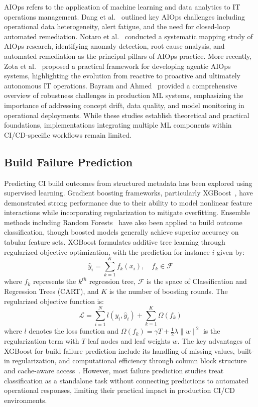 \documentclass[sn-nature]{sn-jnl}
\theoremstyle{thmstyleone}
\theoremstyle{thmstyletwo}
\theoremstyle{thmstylethree}
\begin{document}
AIOps refers to the application of machine learning and data analytics to IT operations management.
Dang et al.~\cite{dang2019aiops} outlined key AIOps challenges including operational data heterogeneity, alert fatigue, and the need for closed-loop automated remediation.
Notaro et al.~\cite{notaro2021aiops} conducted a systematic mapping study of AIOps research, identifying anomaly detection, root cause analysis, and automated remediation as the principal pillars of AIOps practice.
More recently, Zota et al.~\cite{zota2025agentic} proposed a practical framework for developing agentic AIOps systems, highlighting the evolution from reactive to proactive and ultimately autonomous IT operations.
Bayram and Ahmed~\cite{bayram2025trustworthy} provided a comprehensive overview of robustness challenges in production ML systems, emphasizing the importance of addressing concept drift, data quality, and model monitoring in operational deployments.
While these studies establish theoretical and practical foundations, implementations integrating multiple ML components within CI/CD-specific workflows remain limited.

\subsection{Build Failure Prediction}\label{subsec:failure}

Predicting CI build outcomes from structured metadata has been explored using supervised learning.
Gradient boosting frameworks, particularly XGBoost~\cite{chen2016xgboost}, have demonstrated strong performance due to their ability to model nonlinear feature interactions while incorporating regularization to mitigate overfitting.
Ensemble methods including Random Forests~\cite{breiman2001random} have also been applied to build outcome classification, though boosted models generally achieve superior accuracy on tabular feature sets.
XGBoost formulates additive tree learning through regularized objective optimization, with the prediction for instance $i$ given by:
\begin{equation}
\hat{y}_i = \sum_{k=1}^{K} f_k(x_i), \quad f_k \in \mathcal{F}
\end{equation}
where $f_k$ represents the $k^{th}$ regression tree, $\mathcal{F}$ is the space of Classification and Regression Trees (CART), and $K$ is the number of boosting rounds.
The regularized objective function is:
\begin{equation}
\mathcal{L} = \sum_{i=1}^{N} l(y_i, \hat{y}_i) + \sum_{k=1}^{K} \Omega(f_k)
\end{equation}
where $l$ denotes the loss function and $\Omega(f_k) = \gamma T + \frac{1}{2}\lambda\|w\|^2$ is the regularization term with $T$ leaf nodes and leaf weights $w$.
The key advantages of XGBoost for build failure prediction include its handling of missing values, built-in regularization, and computational efficiency through column block structure and cache-aware access~\cite{chen2016xgboost}.
However, most failure prediction studies treat classification as a standalone task without connecting predictions to automated operational responses, limiting their practical impact in production CI/CD environments.
\end{document}
